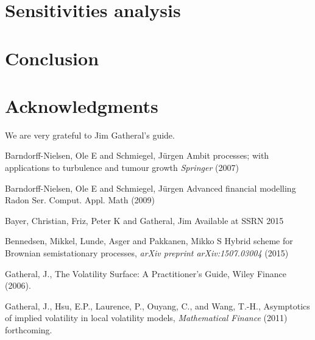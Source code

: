 \documentclass[12pt]{article}
\numberwithin{equation}{section}
\begin{document}
\section{Sensitivities analysis}


\section{Conclusion}



\section*{Acknowledgments}

We are very grateful to Jim Gatheral's guide.

%
%
%
%

\begin{thebibliography}{}

{Barndorff-Nielsen, Ole E} and {Schmiegel, J{\"u}rgen}
{Ambit processes; with applications to turbulence and tumour growth}
{\it Springer} (2007)

{Barndorff-Nielsen, Ole E} and {Schmiegel, J{\"u}rgen}
{Advanced financial modelling}
{Radon Ser. Comput. Appl. Math} (2009)

{Bayer, Christian}, {Friz, Peter K} and {Gatheral, Jim}
{Available at SSRN}
{2015}

{Bennedsen, Mikkel}, {Lunde, Asger} and {Pakkanen, Mikko S}
{Hybrid scheme for Brownian semistationary processes},
{\it arXiv preprint arXiv:1507.03004} (2015)

 { Gatheral, J.},
{The Volatility Surface: A Practitioner's Guide},
{Wiley Finance} (2006).

{ Gatheral, J.}, { Hsu, E.P.}, { Laurence, P.}, { Ouyang, C.}, and { Wang, T.-H.},
{Asymptotics of implied volatility in local volatility models},
{\it Mathematical Finance} (2011) forthcoming.

\end{thebibliography}
\end{document}
